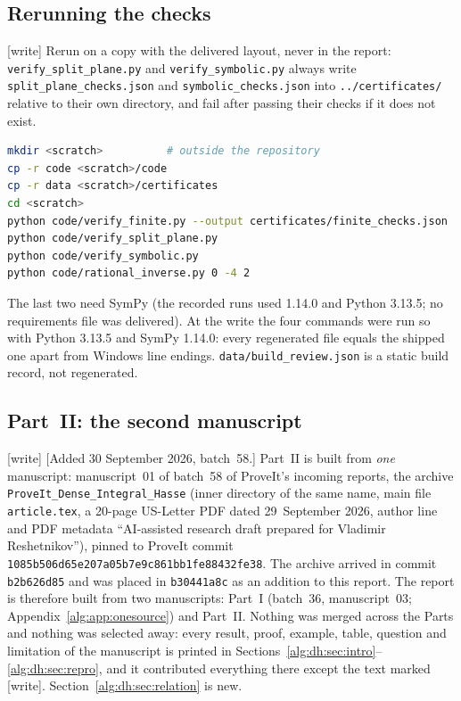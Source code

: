 \documentclass[11pt]{article}
\numberwithin{equation}{section}
\theoremstyle{plain}
\theoremstyle{plain}
\theoremstyle{plain}
\theoremstyle{definition}
\theoremstyle{definition}
\theoremstyle{definition}
\theoremstyle{remark}
\newcommand{\wtag}{\textup{[write]}}%
\newcommand{\rpath}[1]{\nolinkurl{#1}}
\newcommand{\dhsha}{\nolinkurl{1085b506d65e207a05b7e9c861bb1fe88432fe38}}
\begin{document}
\subsection{Rerunning the checks}\label{alg:app:rerun}
\wtag{} Rerun on a copy with the delivered layout, never in the report:
\rpath{verify_split_plane.py} and \rpath{verify_symbolic.py} always
write \rpath{split_plane_checks.json} and \rpath{symbolic_checks.json}
into \rpath{../certificates/} relative to their own directory, and fail
after passing their checks if it does not exist.
\begin{lstlisting}[language=bash]
mkdir <scratch>          # outside the repository
cp -r code <scratch>/code
cp -r data <scratch>/certificates
cd <scratch>
python code/verify_finite.py --output certificates/finite_checks.json
python code/verify_split_plane.py
python code/verify_symbolic.py
python code/rational_inverse.py 0 -4 2
\end{lstlisting}
The last two need SymPy (the recorded runs used 1.14.0 and Python 3.13.5;
no requirements file was delivered). At the write the four commands were
run so with Python 3.13.5 and SymPy 1.14.0: every regenerated file equals
the shipped one apart from Windows line endings.
\rpath{data/build_review.json} is a static build record, not regenerated.

\subsection{Part~II: the second manuscript}\label{alg:dh:app:provenance}
\wtag{} [Added 30 September 2026, batch~58.] Part~II is built from
\emph{one} manuscript: manuscript~01 of batch~58 of ProveIt's incoming
reports, the archive \texttt{ProveIt\_Dense\_Integral\_Hasse} (inner
directory of the same name, main file \texttt{article.tex}, a 20-page
US-Letter PDF dated 29~September 2026, author line and PDF metadata
``AI-assisted research draft prepared for Vladimir Reshetnikov''), pinned
to ProveIt commit \dhsha. The archive arrived in commit
\texttt{b2b626d85} and was placed in \texttt{b30441a8c} as an addition
to this report. The report is therefore built from two manuscripts:
Part~I (batch~36, manuscript~03; Appendix~\ref{alg:app:onesource}) and
Part~II. Nothing was merged across the Parts and nothing was selected
away: every result, proof, example, table, question and limitation of the
manuscript is printed in
Sections~\ref{alg:dh:sec:intro}--\ref{alg:dh:sec:repro}, and it
contributed everything there except the text marked \wtag.
Section~\ref{alg:dh:sec:relation} is new.
\end{document}
